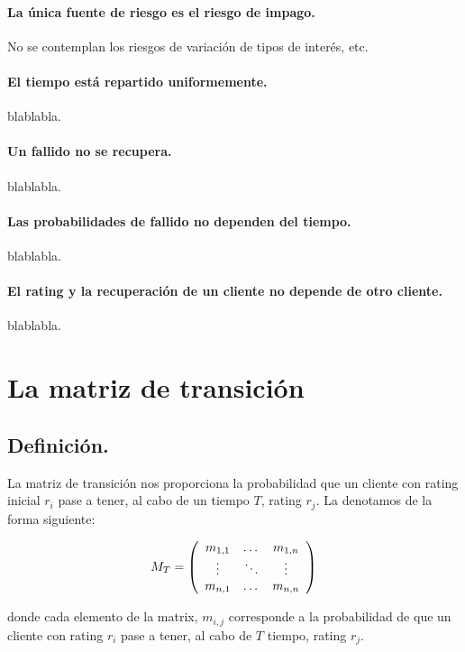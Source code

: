 \paragraph{La \'unica fuente de riesgo es el riesgo de impago.}
No se contemplan los riesgos de variaci\'on de tipos de inter\'es, etc.

\paragraph{El tiempo est\'a repartido uniformemente.}
blablabla.

\paragraph{Un fallido no se recupera.}
blablabla.

\paragraph{Las probabilidades de fallido no dependen del tiempo.}
blablabla.

\paragraph{El rating y la recuperaci\'on de un cliente no depende de otro cliente.}
blablabla.



\section{La matriz de transici\'on}

\subsection{Definici\'on.} La matriz de transici\'on nos proporciona la probabilidad 
que un cliente con rating inicial $r_i$ pase a tener, al cabo de un tiempo $T$, 
rating $r_j$. La denotamos de la forma siguiente:

\begin{displaymath}
M_T = \left(
\begin{array}{ccc}
m_{1,1} & \dots  & m_{1,n} \cr
\vdots & \ddots & \vdots \cr
m_{n,1} & \dots  & m_{n,n} 
\end{array}
\right)
\end{displaymath}

\noindent donde cada elemento de la matrix, $m_{i,j}$ corresponde a la 
probabilidad de que un cliente con rating $r_i$ pase a tener, al cabo de $T$ 
tiempo, rating $r_j$.

